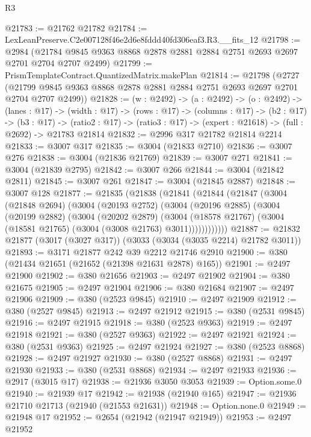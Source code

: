 \begin{lexlean}{R3}
\begin{coremodule}
@21783 := @21762 @21782
@21784 := LexLeanPreserve.C2e007128f46e2d6e8fddd40fd306eaf3.R3.__fits_12
@21798 := @2984
    (@21784 @9845 @9363 @8868 @2878 @2881 @2884 @2751 @2693 @2697 @2701 @2704 @2707 @2499)
@21799 := PrismTemplateContract.QuantizedMatrix.makePlan
@21814 := @21798
    (@2727 (@21799 @9845 @9363 @8868 @2878 @2881 @2884 @2751 @2693 @2697 @2701 @2704 @2707 @2499))
@21828 := (w : @2492) ->
  (a : @2492) ->
  (o : @2492) ->
  (lanes : @17) ->
  (width : @17) ->
  (rows : @17) ->
  (columns : @17) ->
  (b2 : @17) ->
  (b3 : @17) ->
  (ratio2 : @17) -> (ratio3 : @17) -> (expert : @21618) -> (full : @2692) -> @21783 @21814
@21832 := @2996 @317 @21782 @21814 @2214
@21833 := @3007 @317
@21835 := @3004 (@21833 @2710)
@21836 := @3007 @276
@21838 := @3004 (@21836 @21769)
@21839 := @3007 @271
@21841 := @3004 (@21839 @2795)
@21842 := @3007 @266
@21844 := @3004 (@21842 @2811)
@21845 := @3007 @261
@21847 := @3004 (@21845 @2887)
@21848 := @3007 @128
@21877 := @21835
    (@21838
      (@21841
        (@21844
          (@21847
            (@3004
              (@21848 @2694)
              (@3004
                (@20193 @2752)
                (@3004
                  (@20196 @2885)
                  (@3004
                    (@20199 @2882)
                    (@3004
                      (@20202 @2879)
                      (@3004
                        (@18578 @21767)
                        (@3004 (@18581 @21765) (@3004 (@3008 @21763) @3011))))))))))))
@21887 := @21832 @21877 (@3017 (@3027 @317)) (@3033 (@3034 (@3035 @2214) @21782 @3011))
@21893 := @3171 @21877 @242 @39 @2212 @21746 @2910
@21900 := @380 (@21434 @21651 (@21652 (@21398 @21631 @2878) @165))
@21901 := @2497 @21900
@21902 := @380 @21656
@21903 := @2497 @21902
@21904 := @380 @21675
@21905 := @2497 @21904
@21906 := @380 @21684
@21907 := @2497 @21906
@21909 := @380 (@2523 @9845)
@21910 := @2497 @21909
@21912 := @380 (@2527 @9845)
@21913 := @2497 @21912
@21915 := @380 (@2531 @9845)
@21916 := @2497 @21915
@21918 := @380 (@2523 @9363)
@21919 := @2497 @21918
@21921 := @380 (@2527 @9363)
@21922 := @2497 @21921
@21924 := @380 (@2531 @9363)
@21925 := @2497 @21924
@21927 := @380 (@2523 @8868)
@21928 := @2497 @21927
@21930 := @380 (@2527 @8868)
@21931 := @2497 @21930
@21933 := @380 (@2531 @8868)
@21934 := @2497 @21933
@21936 := @2917 (@3015 @17)
@21938 := @21936 @3050 @3053
@21939 := Option.some.{0}
@21940 := @21939 @17
@21942 := @21938 (@21940 @165)
@21947 := @21936 @21710 @21713 (@21940 (@21553 @21631))
@21948 := Option.none.{0}
@21949 := @21948 @17
@21952 := @2654 (@21942 (@21947 @21949))
@21953 := @2497 @21952

\end{coremodule}
\end{lexlean}
